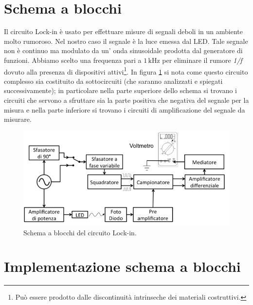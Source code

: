\documentclass[10pt,a4paper]{article}
\begin{document}
\section{Schema a blocchi}
Il circuito Lock-in è usato per effettuare misure di segnali deboli in un ambiente molto rumoroso. Nel nostro caso il segnale è la luce emessa dal LED. Tale segnale non è continuo ma modulato da un' onda sinusoidale prodotta dal generatore di funzioni. Abbiamo scelto una frequenza pari a $1\,\mbox{kHz}$ per eliminare il rumore \emph{1/f} dovuto alla presenza di dispositivi attivi\footnote{Può essere prodotto dalle discontinuità intrinseche dei materiali costruttivi.}. In figura \ref{fig:schemablocchi} si nota come questo circuito complesso sia costituito da sottocircuiti (che saranno analizzati e spiegati successivamente); in particolare nella parte superiore dello schema si trovano i circuiti che servono a sfruttare sia la parte positiva che negativa del segnale per la misura e nella parte inferiore si trovano i circuiti di amplificazione del segnale da misurare.

\begin{figure}[!htb]
  \centering
  \includegraphics[scale=0.75]{schemablocchi.png}
\caption{Schema a blocchi del circuito Lock-in.\label{fig:schemablocchi}}
\end{figure}


\section{Implementazione schema a blocchi}
\end{document}
